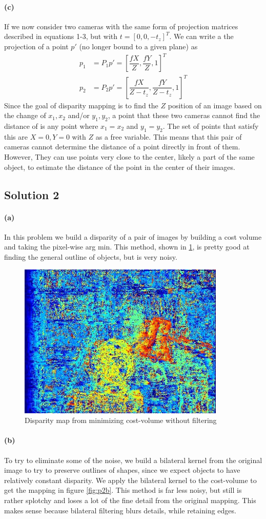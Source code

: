 \documentclass{article}
\newcommand{\solution}[1]{\clearpage \subsection*{Solution #1}}
\newcommand{\spart}[1]{\paragraph{(#1)}}
\begin{document}
\spart{c} If we now consider two cameras with the same form of projection matrices described in equations 1-3, but with $t = [0,0,-t_z]^T$. We can write a the projection of a point $p'$ (no longer bound to a given plane) as
\begin{align}
	p_1 & = P_1 p' = \left[\dfrac{fX}{Z}, \dfrac{fY}{Z}, 1\right]^T\\
	p_2 &= P_2 p' = \left[\dfrac{fX}{Z-t_z}, \dfrac{fY}{Z-t_z}, 1\right]^T
\end{align} 
Since the goal of disparity mapping is to find the $Z$ position of an image based on the change of $x_1,x_2$ and/or $y_1,y_2$, a point that these two cameras cannot find the distance of is any point where $x_1=x_2$ and $y_1=y_2$. The set of points that satisfy this are $X=0, Y=0$ with $Z$ as a free variable. This means that this pair of cameras cannot determine the distance of a point directly in front of them. However, They can use points very close to the center, likely a part of the same object, to estimate the distance of the point in the center of their images. 

\solution{2}

\spart{a} In this problem we build a disparity of a pair of images by building a cost volume and taking the pixel-wise arg min. This method, shown in \ref{fig:p2a}, is pretty good at finding the general outline of objects, but is very noisy. 

\begin{figure}[!h]
  \centering
   \includegraphics[height=20em]{prob2a}
  \caption{Disparity map from minimizing cost-volume without filtering}
  \label{fig:p2a}
\end{figure}

\spart{b} To try to eliminate some of the noise, we build a bilateral kernel from the original image to try to preserve outlines of shapes, since we expect objects to have relatively constant disparity. We apply the bilateral kernel to the cost-volume to get the mapping in figure \ref{fig:p2b}. This method is far less noisy, but still is rather splotchy and loses a lot of the fine detail from the original mapping. This makes sense because bilateral filtering blurs details, while retaining edges.
\end{document}
